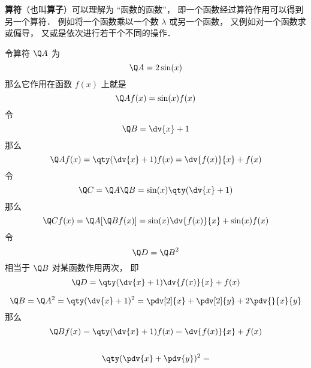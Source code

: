 

\textbf{算符}（也叫\textbf{算子}）可以理解为 “函数的函数”， 即一个函数经过算符作用可以得到另一个算符． 例如将一个函数乘以一个数 $\lambda$ 或另一个函数， 又例如对一个函数求或偏导， 又或是依次进行若干个不同的操作．

\begin{example}{}
令算符 $\Q A$ 为
\begin{equation}
\Q A = 2\sin(x)
\end{equation}
那么它作用在函数 $f(x)$ 上就是
\begin{equation}
\Q A f(x) = \sin(x) f(x)
\end{equation}
令
\begin{equation}
\Q B = \dv{x} + 1
\end{equation}
那么
\begin{equation}
\Q A f(x) = \qty(\dv{x} + 1)f(x) = \dv{f(x)}{x} + f(x)
\end{equation}
令
\begin{equation}
\Q C = \Q A \Q B = \sin(x) \qty(\dv{x} + 1)
\end{equation}
那么
\begin{equation}
\Q C f(x) = \Q A [\Q B f(x)] = \sin(x)\dv{f(x)}{x} + \sin(x)f(x)
\end{equation}
令
\begin{equation}
\Q D = {\Q B}^2
\end{equation}
相当于 $\Q B$ 对某函数作用两次， 即
\begin{equation}
\Q D = \qty(\dv{x} + 1)\dv{f(x)}{x} + f(x)
\end{equation}

\end{example}


\begin{equation}
\Q B = \Q A^2 = \qty(\dv{x} + 1)^2 = \pdv[2]{x} + \pdv[2]{y} + 2\pdv{}{x}{y}
\end{equation}
那么
\begin{equation}
\Q B f(x) = \qty(\dv{x} + 1)f(x) = \dv{f(x)}{x} + f(x)
\end{equation}



\begin{equation}

\end{equation}

\begin{equation}
\qty(\pdv{x} + \pdv{y})^2 = 
\end{equation}

